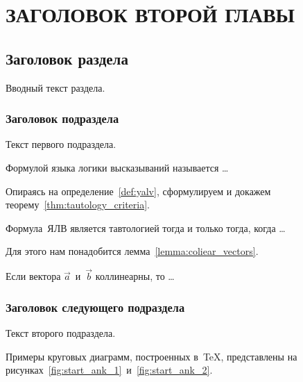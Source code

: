 \section{\MakeTextUppercase{Заголовок второй главы}}

\subsection{Заголовок раздела}

Вводный текст раздела.

\subsubsection{Заголовок подраздела}

Текст первого подраздела.

\begin{definition}\label{def:yalv}
	Формулой языка логики высказываний называется \ldots
\end{definition}

Опираясь на определение~\ref{def:yalv}, сформулируем и докажем теорему~\ref{thm:tautology_criteria}.

\begin{theorem}\label{thm:tautology_criteria}
	Формула~ЯЛВ является тавтологией тогда и только тогда, когда \ldots
\end{theorem}

Для этого нам понадобится лемма~\ref{lemma:coliear_vectors}.

\begin{lemma}\label{lemma:coliear_vectors}
	 Если вектора $\vec{a}$~и~$\vec{b}$ коллинеарны, то \ldots
\end{lemma}

\subsubsection{Заголовок следующего подраздела}

Текст второго подраздела.

Примеры круговых диаграмм, построенных в~TeX, представлены на рисунках~\ref{fig:start_ank_1}~и~\ref{fig:start_ank_2}.

